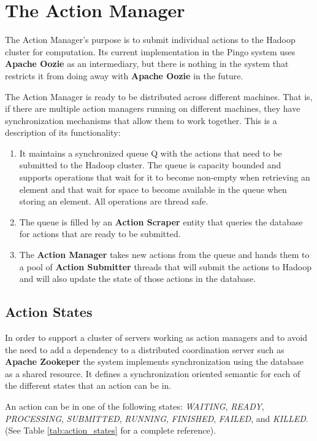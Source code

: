 \section{The Action Manager}
The Action Manager's purpose is to submit individual actions to the Hadoop cluster for computation. Its current implementation in the Pingo system uses \textbf{Apache Oozie} as an intermediary, but there is nothing in the system that restricts it from doing away with \textbf{Apache Oozie} in the future.

The Action Manager is ready to be distributed across different machines. That is, if there are multiple action managers running on different machines, they have synchronization mechanisms that allow them to work together.  This is a description of its functionality:

\begin{enumerate}
\item It maintains a synchronized queue Q with the actions that need to be submitted to the Hadoop cluster. The queue is capacity bounded and supports operations that wait for it to become non-empty when retrieving an element and that wait for space to become available in the queue when storing an element. All operations are thread safe.
\item The queue is filled by an \textbf{Action Scraper} entity that queries the database for actions that are ready to be submitted.
\item The \textbf{Action Manager} takes new actions from the queue and hands them to a pool of \textbf{Action Submitter} threads that will submit the actions to Hadoop and will also update the state of those actions in the database.
\end{enumerate}

\subsection{Action States}
In order to support a cluster of servers working as action managers and to avoid the need to add a dependency to a distributed coordination server such as \textbf{Apache Zookeper} the system implements synchronization using the database as a shared resource.  It defines a synchronization oriented semantic for each of the different states that an action can be in.

An action can be in one of the following states: \textit{WAITING}, \textit{READY}, \textit{PROCESSING}, \textit{SUBMITTED}, \textit{RUNNING}, \textit{FINISHED}, \textit{FAILED}, and \textit{KILLED}.  (See Table \ref{tab:action_states} for a complete reference).

